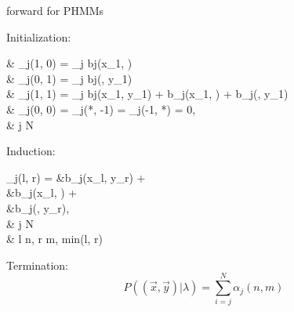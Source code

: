 \documentclass[a4paper,10pt]{article}
\begin{document}
\begin{algorithm}[]
\caption{forward for PHMMs}
  \DontPrintSemicolon
{}
\BlankLine

Initialization:
\begin{flalign*}
  & \alpha_j(1, 0) = \pi_j bj(x_1, \epsilon) \\
  & \alpha_j(0, 1) = \pi_j bj(\epsilon, y_1) \\
  & \alpha_j(1, 1) = \pi_j bj(x_1, y_1) + \left[ \displaystyle\sum_{i=1}^N a_{ij} \, \alpha_i(0, 1) \right] b_j(x_1, \epsilon)
  + \left[ \displaystyle\sum_{i=1}^N a_{ij} \, \alpha_i(1, 0) \right] b_j(\epsilon, y_1) \\
  & \alpha_j(0, 0) = \alpha_j(*, -1) = \alpha_j(-1, *) = 0, \\
  &  \leq j \leq N
\end{flalign*}\;

Induction:
\begin{flalign*}
  \alpha_{j}(l, r) =
  &\left[ \displaystyle\sum_{i=1}^N a_{ij} \, \alpha_i(l-1, r-1) \right] b_j(x_l, y_r) + \\
  &\left[ \displaystyle\sum_{i=1}^N a_{ij} \, \alpha_i(l-1, r) \right] b_j(x_l, \epsilon) + \\
  &\left[ \displaystyle\sum_{i=1}^N a_{ij} \, \alpha_i(l, r-1) \right] b_j(\epsilon, y_r), \\
  &  \leq j \leq N \\
  &  \leq l \leq n,  \leq r \leq m,  \leq min(l, r)
\end{flalign*}\;

Termination: \;
$$P((\vec{x}, \vec{y})|\lambda) = \displaystyle\sum_{i=j}^N \alpha_j(n, m)$$\;
\label{fig:forward}
\end{algorithm}
\end{document}
